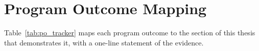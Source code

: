 \chapter{Program Outcome Mapping}
\label{app:po_tracker}

Table~\ref{tab:po_tracker} maps each program outcome to the section of
this thesis that demonstrates it, with a one-line statement of the
evidence.

